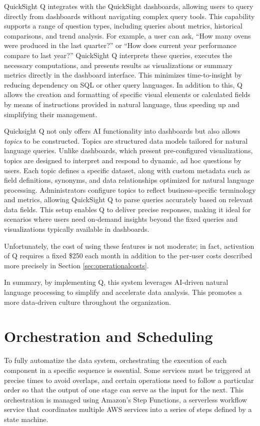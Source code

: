 QuickSight Q integrates with the QuickSight dashboards, allowing users to query directly from dashboards without navigating complex query tools. This capability supports a range of question types, including queries about metrics, historical comparisons, and trend analysis. For example, a user can ask, “How many ovens were produced in the last quarter?” or “How does current year performance compare to last year?” QuickSight Q interprets these queries, executes the necessary computations, and presents results as visualizations or summary metrics directly in the dashboard interface. This minimizes time-to-insight by reducing dependency on \ac{SQL} or other query languages. In addition to this, Q allows the creation and formatting of specific visual elements or calculated fields by means of instructions provided in natural language, thus speeding up and simplifying their management.

Quicksight Q not only offers AI functionality into dashboards but also allows \textit{topics} to be constructed. Topics are structured data models tailored for natural language queries. Unlike dashboards, which present pre-configured visualizations, topics are designed to interpret and respond to dynamic, ad hoc questions by users. Each topic defines a specific dataset, along with custom metadata such as field definitions, synonyms, and data relationships optimized for natural language processing. Administrators configure topics to reflect business-specific terminology and metrics, allowing QuickSight Q to parse queries accurately based on relevant data fields. This setup enables Q to deliver precise responses, making it ideal for scenarios where users need on-demand insights beyond the fixed queries and visualizations typically available in dashboards.

Unfortunately, the cost of using these features is not moderate; in fact, activation of Q requires a fixed \$250 each month in addition to the per-user costs described more precisely in Section \ref{sec:operationalcosts}.

In summary, by implementing Q, this system leverages AI-driven natural language processing to simplify and accelerate data analysis. This promotes a more data-driven culture throughout the organization.

\section{Orchestration and Scheduling}
To fully automatize the data system, orchestrating the execution of each component in a specific sequence is essential. Some services must be triggered at precise times to avoid overlaps, and certain operations need to follow a particular order so that the output of one stage can serve as the input for the next. This orchestration is managed using Amazon's Step Functions, a serverless workflow service that coordinates multiple \ac{AWS} services into a series of steps defined by a state machine.

